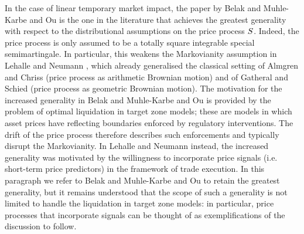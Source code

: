 \documentclass[10pt,a4paper]{article}
\begin{document}
In the case of linear temporary market impact, the paper by Belak and Muhle-Karbe and Ou \cite{BMO18opt} is the one in the literature that achieves the greatest generality with respect to the distributional assumptions on the price process $S$. Indeed, the price process is only assumed to be a totally square integrable special semimartingale. In particular, this weakens the Markovianity assumption in Lehalle and Neumann \cite{LN19inc}, which already generalised the classical setting of Almgren and Chriss \cite{AC00opt} (price process as arithmetic Brownian motion) and of Gatheral and Schied \cite{GS11opt} (price process as geometric Brownian motion). The motivation for the increased generality in Belak and Muhle-Karbe and Ou \cite{BMO18opt} is provided by the problem of optimal liquidation in target zone models; these are models in which asset prices have reflecting boundaries enforced by regulatory interventions. The drift of the price process therefore describes such enforcements and typically disrupt the Markovianity. In Lehalle and Neumann \cite{LN19inc} instead, the increased generality was motivated by the willingness to incorporate price signals (i.e. short-term price predictors) in the framework of trade execution.  In this  paragraph we refer to   Belak and Muhle-Karbe and Ou \cite{BMO18opt} to retain the greatest generality, but it remains understood that the scope of such a generality is not limited to handle the liquidation in target zone models: in particular, price processes that incorporate signals can be thought of as exemplifications of the discussion to follow. 
\end{document}
